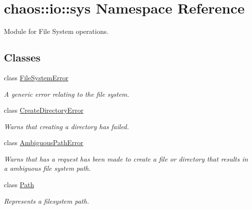 \hypertarget{namespacechaos_1_1io_1_1sys}{\section{chaos\-:\-:io\-:\-:sys Namespace Reference}
\label{namespacechaos_1_1io_1_1sys}
}


Module for File System operations.  


\subsection*{Classes}
\begin{DoxyCompactItemize}
\item 
class \hyperlink{classchaos_1_1io_1_1sys_1_1_file_system_error}{File\-System\-Error}
\begin{DoxyCompactList}\small\item\em A generic error relating to the file system. \end{DoxyCompactList}\item 
class \hyperlink{classchaos_1_1io_1_1sys_1_1_create_directory_error}{Create\-Directory\-Error}
\begin{DoxyCompactList}\small\item\em Warns that creating a directory has failed. \end{DoxyCompactList}\item 
class \hyperlink{classchaos_1_1io_1_1sys_1_1_ambiguous_path_error}{Ambiguous\-Path\-Error}
\begin{DoxyCompactList}\small\item\em Warns that has a request has been made to create a file or directory that results in a ambiguous file system path. \end{DoxyCompactList}\item 
class \hyperlink{classchaos_1_1io_1_1sys_1_1_path}{Path}
\begin{DoxyCompactList}\small\item\em Represents a filesystem path. \end{DoxyCompactList}\end{DoxyCompactItemize}
